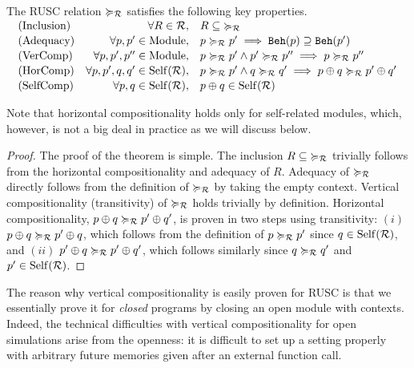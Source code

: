 \begin{theorem}\label{thm:rusc} The RUSC relation $\succcurlyeq_{\mathcal{R}}$ satisfies the following key properties.\\[.5mm]
$
\begin{array}{@{\quad}lrl}
 \text{(Inclusion)} &\forall R \in \rels,& R \subseteq {\rusc_\rels} \\[.5mm]
 \text{(Adequacy)} &\forall p,p'\in\Module,& p \rusc_{\rels} p' \implies \beh{p} \supseteq \beh{p'} \\[.5mm]
 \text{(VerComp)} &\forall p,p',p''\in\Module,& p \rusc_{\rels} p' \land p' \rusc_{\rels} p'' \implies p \rusc_{\rels} p'' \\[.5mm]
 \text{(HorComp)} &\forall p,p',q,q'\in \self{\rels},&   p \rusc_{\rels} p' \land  q \rusc_{\rels} q' \implies p \llink q \rusc_{\rels} p' \llink q' \\[.5mm]
 \revision{\text{(SelfComp)}} & \revision{\forall p,q \in \self{\rels},}& \revision{p \llink q \in \self{\rels}}
\end{array}
$
\end{theorem}
Note that horizontal compositionality holds only for self-related
modules, which, however, is not a big deal in practice as we will
discuss below.
\begin{proof}
The proof of the theorem is simple.  The
inclusion $R \subseteq {\ensuremath{\succcurlyeq}_{\mathcal{R}}}$ trivially follows from the
horizontal compositionality and adequacy of $R$.  Adequacy of
$\succcurlyeq_{\mathcal{R}}$ directly follows from the definition of $\succcurlyeq_{\mathcal{R}}$ by
taking the empty context. Vertical compositionality (\ie transitivity)
of $\succcurlyeq_{\mathcal{R}}$ holds trivially by definition.  Horizontal
compositionality, $p \oplus q \succcurlyeq_{\mathcal{R}} p' \oplus q'$, is proven
in two steps using transitivity: $(i)$ $p \oplus q \succcurlyeq_{\mathcal{R}} p' \oplus q$,
which follows from the definition of $p \succcurlyeq_{\mathcal{R}} p'$ since $q\in\mathrm{Self}(\mathcal{R})$,
and $(ii)$ $p' \oplus q \succcurlyeq_{\mathcal{R}} p' \oplus q'$, which follows
similarly since $q \succcurlyeq_{\mathcal{R}} q'$ and $p'\in\mathrm{Self}(\mathcal{R})$.
\end{proof}

The reason why vertical compositionality is easily proven for RUSC
is that we essentially prove it for \emph{closed} programs by
closing an open module with contexts. Indeed, the technical
difficulties with vertical compositionality for open
simulations arise from the openness: it is difficult to set up a
setting properly with arbitrary future memories given after an external
function call.


